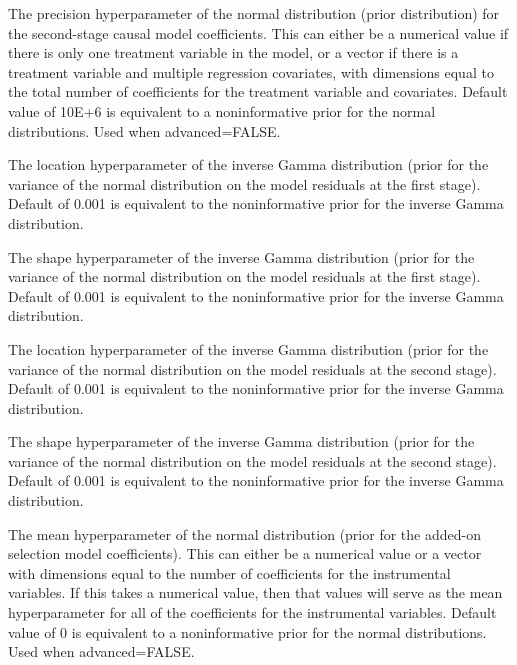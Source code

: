 \documentclass[a4paper]{book}
\begin{document}
\begin{Arguments}
\begin{ldescription}
\item[\code{G0}] The precision hyperparameter of the normal distribution (prior distribution)
for the second-stage causal model coefficients.
This can either be a numerical value if there is only one treatment variable in the model,
or a vector if there is a treatment variable and multiple regression covariates,
with dimensions equal to the total number of coefficients for the treatment variable and covariates.
Default value of 10E+6 is equivalent to a noninformative prior for the normal distributions.
Used when advanced=FALSE.

\item[\code{u0}] The location hyperparameter of the inverse Gamma distribution (prior for the variance of the
normal distribution on the model residuals at the first stage).
Default of 0.001 is equivalent to the noninformative prior for the inverse Gamma distribution.

\item[\code{U0}] The shape hyperparameter of the inverse Gamma distribution (prior for the variance of the
normal distribution on the model residuals at the first stage).
Default of 0.001 is equivalent to the noninformative prior for the inverse Gamma distribution.

\item[\code{e0}] The location hyperparameter of the inverse Gamma distribution (prior for the variance of the
normal distribution on the model residuals at the second stage).
Default of 0.001 is equivalent to the noninformative prior for the inverse Gamma distribution.

\item[\code{E0}] The shape hyperparameter of the inverse Gamma distribution (prior for the variance of the
normal distribution on the model residuals at the second stage).
Default of 0.001 is equivalent to the noninformative prior for the inverse Gamma distribution.

\item[\code{l0}] The mean hyperparameter of the normal distribution (prior for the added-on selection model coefficients).
This can either be a numerical value or a vector with dimensions equal to the number of coefficients for the instrumental variables.
If this takes a numerical value, then that values will serve as the mean hyperparameter for all of the coefficients
for the instrumental variables. Default value of 0 is equivalent to a noninformative prior for the normal distributions.
Used when advanced=FALSE.


\end{ldescription}
\end{Arguments}
\end{document}
